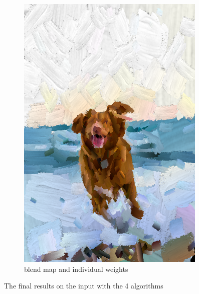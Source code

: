 \documentclass[11pt]{article}
\begin{document}
\begin{figure}[ht]
\begin{subfigure}[b]{0.24\textwidth}
         \includegraphics[width=\textwidth]{blend-singular.png}
         \caption{blend map and individual weights}
         \label{fig:bs}
     \end{subfigure}
      \caption{The final results on the input with the 4 algorithms}
    \label{fig:results}
     
\end{figure}
\end{document}
